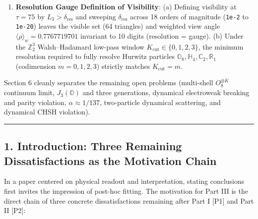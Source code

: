 \documentclass[
  a4paper,
]{article}
\begin{document}
\begin{enumerate}
  observer, whereas in the presence of mass P4 a distant observer
  (\(A_{\mathrm{obs}}=1\)) measures a clear \textbf{tidal splitting
  \(\Delta D_{\mathrm{tidal}} = +0.028615\)} between the radial mass
  direction (\texttt{-0.006094}) and the six tangential directions
  (\texttt{-0.034709\ ±\ 5.27e-16}).
\item
  \textbf{Resolution Gauge Definition of Visibility}: (a) Defining
  visibility at \(\tau = 75\) by \(L_3 > \delta_{\mathrm{res}}\) and
  sweeping \(\delta_{\mathrm{res}}\) across 18 orders of magnitude
  (\texttt{1e-2} to \texttt{1e-20}) leaves the visible set (64
  triangles) and weighted view angle
  \(\langle\rho\rangle_w = 0.7767719701\) invariant to 10 digits
  (resolution = gauge). (b) Under the \(\mathbb{Z}_2^3\) Walsh--Hadamard
  low-pass window \(K_{\mathrm{cut}} \in \{0,1,2,3\}\), the minimum
  resolution required to fully resolve Hurwitz particles
  \(\mathbb{O}_8, \mathbb{H}_4, \mathbb{C}_2, \mathbb{R}_1\)
  (codimension \(m=0,1,2,3\)) strictly matches \(K_{\mathrm{cut}} = m\).
\end{enumerate}

Section 6 cleanly separates the remaining open problems (multi-shell
\(O_8^{\otimes K}\) continuum limit, \(J_3(\mathbb{O})\) and three
generations, dynamical electroweak breaking and parity violation,
\(\alpha \approx 1/137\), two-particle dynamical scattering, and
dynamical CHSH violation).

\begin{center}\rule{0.5\linewidth}{0.5pt}\end{center}

\subsection{1. Introduction: Three Remaining Dissatisfactions as the
Motivation
Chain}\label{introduction-three-remaining-dissatisfactions-as-the-motivation-chain}

In a paper centered on physical readout and interpretation, stating
conclusions first invites the impression of post-hoc fitting. The
motivation for Part III is the direct chain of three concrete
dissatisfactions remaining after Part I {[}P1{]} and Part II {[}P2{]}:
\end{document}
